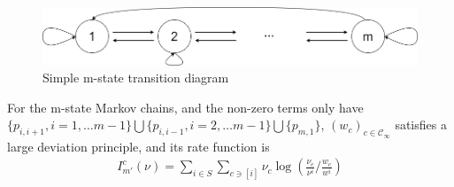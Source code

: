 \documentclass[11pt,en,cite=authoryear]{elegantpaper}
\begin{document}
\begin{figure}[h]
    \centering
    \includegraphics[scale=0.3]{chart/n-state.png}
    \caption{Simple m-state transition diagram}
\end{figure}
\begin{theorem}
    For the m-state Markov chains, and the non-zero terms only have $\{p_{i, i+1}, i=1, \dots m-1\} \bigcup \{p_{i, i-1}, i=2, \dots m-1\} \bigcup \{p_{m,1}\}$, $(w_{c})_{c \in \mathcal{C}_{\infty}}$ satisfies a large deviation principle, and its rate function is
    \begin{align*}
        I_{m'}^{c}(\nu) = \sum_{i \in S} \sum_{c \ni [i]} \nu_c \log \left(\frac{\nu_c}{\nu^i} /\frac{w_c}{w^i}\right)
    \end{align*}
\end{theorem}
\end{document}
